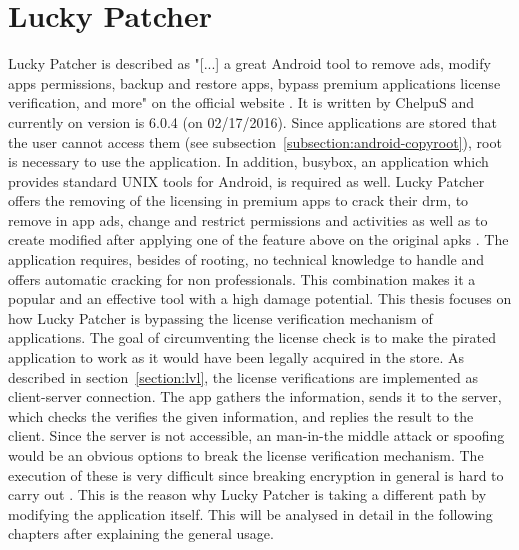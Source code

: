 \section{Lucky Patcher} \label{section:luckypatcher-explain}
Lucky Patcher is described as "[...] a great Android tool to remove ads, modify apps permissions, backup and restore apps, bypass premium applications license verification, and more" on the official website \cite{luckyPatcherOfficial}.
It is written by ChelpuS and currently on version is 6.0.4 (on 02/17/2016).
Since applications are stored that the user cannot access them (see subsection~\ref{subsection:android-copyroot}), root is necessary to use the application.
In addition, busybox, an application which provides standard UNIX tools for Android\cite{busyboxApp}, is required as well.
\newline
Lucky Patcher offers the removing of the licensing in premium apps to crack their \gls{drm}, to remove in app ads, change and restrict permissions and activities as well as to create modified after applying one of the feature above on the original \gls{apk}s \cite{luckyPatcherOfficial}.
\newline
The application requires, besides of rooting, no technical knowledge to handle and offers automatic cracking for non professionals.
This combination makes it a popular and an effective tool with a high damage potential. \cite{munteanLicense}
\newline
This thesis focuses on how Lucky Patcher is bypassing the license verification mechanism of applications.
The goal of circumventing the license check is to make the pirated application to work as it would have been legally acquired in the store.
As described in section~\ref{section:lvl}, the license verifications are implemented as client-server connection.
The app gathers the information, sends it to the server, which checks the verifies the given information, and replies the result to the client.
Since the server is not accessible, an man-in-the middle attack or spoofing would be an obvious options to break the license verification mechanism.
The execution of these is very difficult since breaking encryption in general is hard to carry out \cite{munteanLicense}.
This is the reason why Lucky Patcher is taking a different path by modifying the application itself. This will be analysed in detail in the following chapters after explaining the general usage.
\newline
